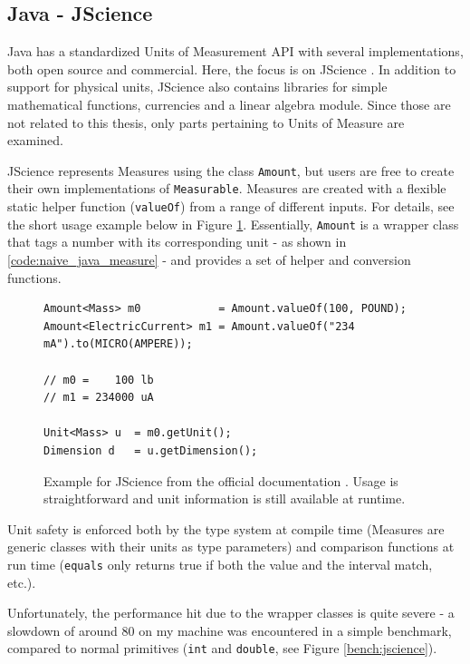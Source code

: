 \documentclass[12pt,oneside,a4paper]{scrbook}
\begin{document}
\subsection{Java - JScience}
Java has a standardized Units of Measurement API \citep{Units13} with several implementations, both open source and commercial. Here, the focus is on JScience \citep{Dautelle11}. In addition to support for physical units, JScience also contains libraries for simple mathematical functions, currencies and a linear algebra module. Since those are not related to this thesis, only parts pertaining to Units of Measure are examined.

JScience represents Measures using the class \verb/Amount/, but users are free to create their own implementations of \verb/Measurable/. Measures are created with a flexible static helper function (\verb/valueOf/) from a range of different inputs. For details, see the short usage example below in Figure \ref{code:jscience_example}. Essentially, \verb/Amount/ is a wrapper class that tags a number with its corresponding unit - as shown in \ref{code:naive_java_measure} - and provides a set of helper and conversion functions.

\begin{figure}
\begin{verbatim}
Amount<Mass> m0            = Amount.valueOf(100, POUND);
Amount<ElectricCurrent> m1 = Amount.valueOf("234 mA").to(MICRO(AMPERE));

// m0 =    100 lb
// m1 = 234000 uA

Unit<Mass> u  = m0.getUnit();
Dimension d   = u.getDimension();

\end{verbatim}
\caption{Example for JScience from the official documentation \citep{Dautelle11}. Usage is straightforward and unit information is still available at runtime.}
\label{code:jscience_example}
\end{figure}

Unit safety is enforced both by the type system at compile time (Measures are generic classes with their units as type parameters) and comparison functions at run time (\verb/equals/ only returns true if both the value and the interval match, etc.).

Unfortunately, the performance hit due to the wrapper classes is quite severe - a slowdown of around 80 on my machine was encountered in a simple benchmark, compared to normal primitives (\verb/int/ and \verb/double/, see Figure \ref{bench:jscience}).
\end{document}
